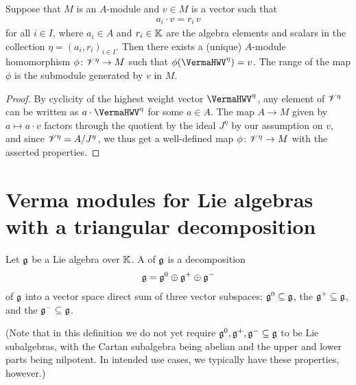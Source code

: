 \begin{lemma}
  \label{lem:VermaUniversalProperty}
  \leanok
  Suppose that $M$ is an $A$-module and $v \in M$ is a vector such that
  \begin{align*}
    a_i \cdot v = r_i \, v
  \end{align*}
  for all $i \in I$, where $a_i \in A$ and $r_i \in \mathbb{K}$ are the algebra elements and scalars in
  the collection $\eta = (a_i, r_i)_{i \in I}$. Then there exists a (unique)
  $A$-module homomorphism $\phi \colon \mathscr{V}^{\eta} \to M$ such that
  $\phi(\VermaHWV^{\eta}) = v$. The range of the map $\phi$ is the submodule
  generated by $v$ in $M$.
\end{lemma}
\begin{proof}
  \leanok
  By cyclicity of the highest weight vector $\VermaHWV^{\eta}$,
  any element of $\mathscr{V}^{\eta}$ can be written as $a \cdot \VermaHWV^{\eta}$
  for some $a \in A$.
  The map $A \to M$ given by $a \mapsto a \cdot v$ factors through
  the quotient by the ideal $J^{\eta}$ by our assumption on $v$,
  and since $\mathscr{V}^{\eta} = A / J^{\eta}$, we thus get a well-defined map
  $\phi \colon \mathscr{V}^{\eta} \to M$ with the asserted properties.
\end{proof}


\section{Verma modules for Lie algebras with a triangular decomposition}

\begin{definition}
  \label{def:TriangularDecomposition}
  \leanok
  Let $\mathfrak{g}$ be a Lie algebra over $\mathbb{K}$.
  A  of $\mathfrak{g}$ is a decomposition
  \begin{align*}
    \mathfrak{g} = \mathfrak{g}^0 \oplus \mathfrak{g}^+ \oplus \mathfrak{g}^-
  \end{align*}
  of $\mathfrak{g}$ into a vector space direct sum of three vector subspaces:
   $\mathfrak{g}^0\subseteq \mathfrak{g}$,
  the  $\mathfrak{g}^+ \subseteq \mathfrak{g}$,
  and the  $\mathfrak{g}^- \subseteq \mathfrak{g}$.

  (Note that in this definition we do not yet require
  $\mathfrak{g}^0, \mathfrak{g}^+, \mathfrak{g}^- \subseteq \mathfrak{g}$ to be Lie subalgebras,
  with the Cartan subalgebra being abelian and the
  upper and lower parts being nilpotent. In intended use cases, we
  typically have these properties, however.)
\end{definition}

